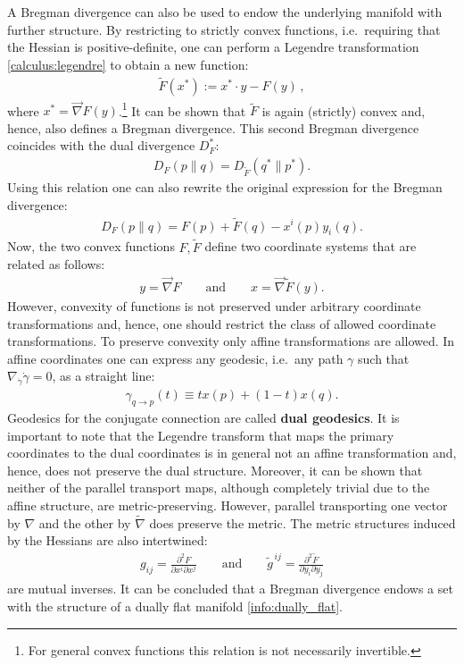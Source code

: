     A Bregman divergence can also be used to endow the underlying manifold with further structure. By restricting to strictly convex functions, i.e.~requiring that the Hessian is positive-definite, one can perform a Legendre transformation \ref{calculus:legendre} to obtain a new function:
    \begin{gather}
        \label{info:legendre}
        \widetilde{F}(x^*) := x^*\cdot y - F(y)\,,
    \end{gather}
    where $x^*=\vec{\nabla}F(y)$.\footnote{For general convex functions this relation is not necessarily invertible.} It can be shown that $\widetilde{F}$ is again (strictly) convex and, hence, also defines a Bregman divergence. This second Bregman divergence coincides with the dual divergence $D_F^*$:
    \begin{gather}
        D_F(p\|q) = D_{\widetilde{F}}(q^*\|p^*).
    \end{gather}
    Using this relation one can also rewrite the original expression for the Bregman divergence:
    \begin{gather}
        D_F(p\|q) = F(p) + \widetilde{F}(q) - x^i(p)y_i(q).
    \end{gather}
    Now, the two convex functions $F,\widetilde{F}$ define two coordinate systems that are related as follows:
    \begin{gather}
        y=\vec{\nabla}F\qquad\text{and}\qquad x=\vec{\nabla}\widetilde{F}(y).
    \end{gather}
    However, convexity of functions is not preserved under arbitrary coordinate transformations and, hence, one should restrict the class of allowed coordinate transformations. To preserve convexity only affine transformations are allowed. In affine coordinates one can express any geodesic, i.e.~any path $\gamma$ such that $\nabla_{\dot{\gamma}}\dot{\gamma}=0$, as a straight line:
    \begin{gather}
        \gamma_{q\rightarrow p}(t) \equiv tx(p) + (1-t)x(q).
    \end{gather}
    Geodesics for the conjugate connection are called \textbf{dual geodesics}. It is important to note that the Legendre transform that maps the primary coordinates to the dual coordinates is in general not an affine transformation and, hence, does not preserve the dual structure. Moreover, it can be shown that neither of the parallel transport maps, although completely trivial due to the affine structure, are metric-preserving. However, parallel transporting one vector by $\nabla$ and the other by $\widetilde{\nabla}$ does preserve the metric. The metric structures induced by the Hessians are also intertwined:
    \begin{gather}
        \label{info:bregman_metric}
        g_{ij} = \frac{\partial^2F}{\partial x^i\partial x^j}\qquad\text{and}\qquad \widetilde{g}^{\,ij} = \frac{\partial^2\widetilde{F}}{\partial y_i\partial y_j}
    \end{gather}
    are mutual inverses. It can be concluded that a Bregman divergence endows a set with the structure of a dually flat manifold \ref{info:dually_flat}.

